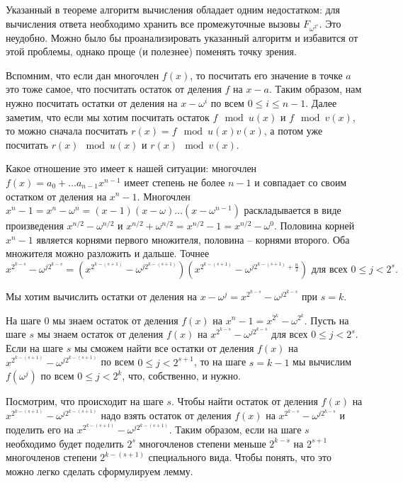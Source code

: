 Указанный в теореме алгоритм вычисления обладает одним недостатком: для вычисления ответа необходимо хранить все промежуточные вызовы $F_{\omega^{2^s}}$. Это неудобно. Можно было бы проанализировать указанный алгоритм и избавится от этой проблемы, однако проще (и полезнее) поменять точку зрения.



Вспомним, что если дан многочлен $f(x)$, то посчитать его значение в точке $a$ это тоже самое, что посчитать остаток от деления $f$ на $x-a$. Таким образом, нам нужно посчитать остатки от деления на $x-\omega^i$ по всем $0\leq i\leq n-1$. 
Далее заметим, что если мы хотим посчитать остаток $f \mod u(x)$ и $f \mod v(x)$, то можно сначала посчитать $r(x)=f\mod u(x)v(x)$, а потом уже посчитать $r(x) \mod u(x)$ и $r(x) \mod v(x)$.

Какое отношение это имеет к нашей ситуации: многочлен $f(x)=a_0+\dots a_{n-1}x^{n-1}$ имеет степень не более $n-1$ и совпадает со своим остатком от деления на $x^n-1$. Многочлен $x^n-1=x^n-\omega^n=(x-1)(x-\omega)\dots(x-\omega^{n-1})$ раскладывается в виде произведения $x^{n/2}-\omega^{n/2}$ и $x^{n/2}+\omega^{n/2}=x^{n/2}-1=x^{n/2}-\omega^0$. Половина корней $x^n-1$ является корнями первого множителя, половина -- корнями второго. Оба множителя можно разложить и дальше.
Точнее $$x^{2^{k-s}}-\omega^{j2^{k-s}}=(x^{2^{k-(s+1)}}-\omega^{j2^{k-(s+1)}})(x^{2^{k-(s+1)}}-\omega^{j2^{k-(s+1)}+\frac{n}{2}})  \text{ для всех } 0\leq j< 2^s.$$ 

Мы хотим вычислить остатки от деления на $x-\omega^j=x^{2^{k-s}}-\omega^{j2^{k-s}}$ при  $s=k$.

На шаге $0$ мы знаем остаток от деления $f(x)$ на $x^n-1=x^{2^k}-\omega^{2^k}$. Пусть на шаге $s$ мы знаем остаток от деления $f(x)$  на $x^{2^{k-s}}-\omega^{j2^{k-s}}$ для всех $0\leq j< 2^s$. Если на шаге $s$ мы сможем найти все остатки от деления $f(x)$ на  $x^{2^{k-(s+1)}}-\omega^{j2^{k-(s+1)}}$ по всем $0\leq j< 2^{s+1}$, то на шаге $s=k-1$ мы вычислим $f(\omega^j)$ по всем $0\leq j <2^k$, что, собственно, и нужно.

Посмотрим, что происходит на шаге $s$. Чтобы найти остаток от деления $f(x)$ на $x^{2^{k-(s+1)}}-\omega^{j2^{k-(s+1)}}$ надо взять остаток от деления  $f(x)$ на $x^{2^{k-s}}-\omega^{j2^{k-s}}$ и поделить его на $x^{2^{k-(s+1)}}-\omega^{j2^{k-(s+1)}}$. Таким образом, если на шаге $s$ необходимо будет поделить $2^s$ многочленов степени меньше $2^{k-s}$ на $2^{s+1}$ многочленов степени $2^{k-(s+1)}$ специального вида. Чтобы понять, что это можно легко сделать сформулируем лемму.

